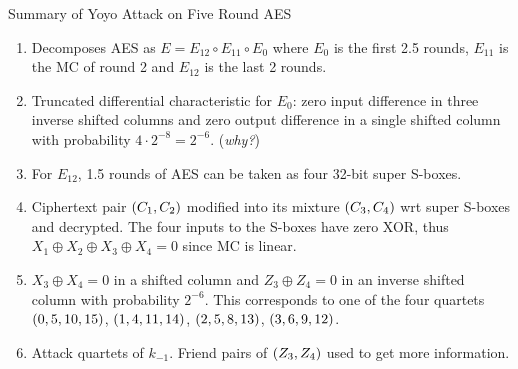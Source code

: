 \documentclass[notheorems]{beamer}
\theoremstyle{definition}
\theoremstyle{example}
\begin{document}
    \begin{frame}[<+->]{Summary of Yoyo Attack on Five Round AES}
        \begin{enumerate}
            \item Decomposes AES as \(E = E_{12} \circ E_{11} \circ E_0\) where
            \(E_0\) is the first 2.5 rounds, \(E_{11}\) is the MC of round 2 and
            \(E_{12}\) is the last 2 rounds.
            \item Truncated differential characteristic for \(E_0\): zero input
            difference in three inverse shifted columns and zero output
            difference in a single shifted column with probability \(4 \cdot
            2^{-8} = 2^{-6}\). (\emph{why?})
            \item For \(E_{12}\), 1.5 rounds of AES can be taken as four 32-bit
            super S-boxes.
            \item Ciphertext pair \((C_1, C_2)\) modified into its mixture
            \((C_3, C_4)\) wrt super S-boxes and decrypted. The four inputs
            to the S-boxes have zero XOR, thus \(X_1 \oplus X_2 \oplus X_3
            \oplus X_4 = 0\) since MC is linear. 
            \item \(X_3 \oplus X_4 = 0\) in a shifted column and \(Z_3 \oplus
            Z_4 = 0\) in an inverse shifted column with probability \(2^{-6}\).
            This corresponds to one of the four quartets \((0,5,10,15)\),
            \((1,4,11,14)\), \((2,5,8,13)\), \((3,6,9,12)\).
            \item Attack quartets of \(k_{-1}\). Friend pairs of \((Z_3,
            Z_4)\) used to get more information.
        \end{enumerate}
    \end{frame}
\end{document}

